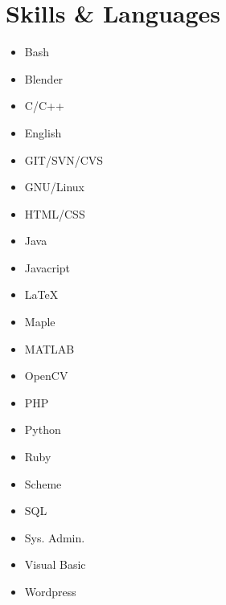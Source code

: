 \documentclass[a4paper,10pt]{article}
\begin{document}
\section{Skills \& Languages}
\begin{multicols}{3}
\raggedcolumns
\begin{itemize}
\renewcommand{\labelitemi}{\textcolor{lightg}{\symbol{"00BB}}}
\setlength{\itemsep}{1pt}
\setlength{\parskip}{0pt}
\setlength{\parsep}{0pt}
\item Bash \hfill \fournotes
\item Blender \hfill \threenotes
\item C/C++ \hfill \fournotes 
\item English \hfill \fivenotes
\item GIT/SVN/CVS \hfill \fournotes
\item GNU/Linux \hfill \fournotes
\item HTML/CSS \hfill \fournotes
\item Java \hfill \fivenotes
\item Javacript \hfill \threenotes
\item \LaTeX \hfill \fournotes
\item Maple \hfill \threenotes
\item MATLAB \hfill \fivenotes
\item OpenCV \hfill \fournotes
\item PHP \hfill \fournotes
\item Python \hfill \threenotes
\item Ruby \hfill \onenote
\item Scheme \hfill \fivenotes
\item SQL \hfill \threenotes
\item Sys. Admin. \hfill \threenotes
\item Visual Basic \hfill \fivenotes
\item Wordpress \hfill \fournotes
\end{itemize}
\end{multicols}
\end{document}
